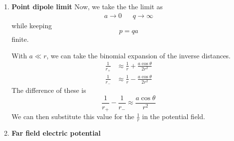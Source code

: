 \begin{enumerate}
\begin{enumerate}
						    We start with the assumption that we have a point source at the origin. We 
							know its electric field
							\begin{equation}
								\vb{E_+} = \frac{q}{4\pi\epsz}\frac{\vu{r}}{r^2}  = \frac{q}{4\pi\epsz}\frac{\vb{r}}{r^3}
							\end{equation}
							We then \textit{translate} this point source ${a}/{2}$ units on the $+z$ direction.
							\begin{equation}
								\vb{E_+} = \frac{q}{4\pi\epsz}\frac{(\vb{r}-\frac{a}{2}\vu{z})}{r_+^3}
							\end{equation}
					  \item $-q$ \textbf{Electric field}
						    We take the same logic from the previous step but translate the negative point
							down by ${a}/{2}$, to the $-z$ direction.
							\begin{equation}
							    \vb{E}_- = -\frac{q}{4\pi\epsz}\frac{(\vb{r}+\frac{a}{2}\vu{z})}{r_-^3}
							\end{equation}
				  \end{enumerate}
				  Taking the vector sum of this results to the total electric field
				  \[
					  \vb{E} = \vb{E}_+ + \vb{E}_-
				  \]
				  Explicitly, we have
				  \begin{equation}
					  \vb{E} = \frac{q}{4\pi\epsz}\pqty{
						  \frac{\vb{r}-\frac{a}{2}\vu{z}}{r_+^3} 
						  -
						  \frac{\vb{r}+\frac{a}{2}\vu{z}}{r_-^3} 
					  } 
				  \end{equation}
			\item \textbf{Point dipole limit}
				  Now, we take the the limit as
				  \begin{align}
					  a\to 0 && q\to\infty
				  \end{align}
				  while keeping 
				  \begin{equation}
				      p = qa
				  \end{equation}
				  finite.

				  With $a\ll r$, we can take the binomial expansion of the inverse distances. 
				  \begin{align}
					  \frac{1}{r_+}&\approx \frac{1}{r}+\frac{a\cos\theta}{2r^2}  \\
					  \frac{1}{r_-}&\approx \frac{1}{r}-\frac{a\cos\theta}{2r^2}  
				  \end{align}
				  The difference of these is
				  \begin{equation}
				      \frac{1}{r_+} - \frac{1}{r_-} \approx \frac{a\cos\theta}{r^2}   
				  \end{equation}
				  We can then substitute this value for the $\frac{1}{r}$ in the potential
				  field.
			\item \textbf{Far field electric potential}
				

\end{enumerate}
